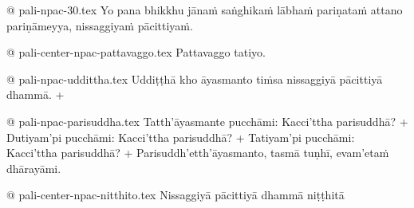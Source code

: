@ pali-npac-30.tex
Yo pana bhikkhu jānaṁ saṅghikaṁ lābhaṁ pariṇataṁ attano pariṇāmeyya, nissaggiyaṁ pācittiyaṁ.

@ pali-center-npac-pattavaggo.tex
Pattavaggo tatiyo.

@ pali-npac-uddittha.tex
Uddiṭṭhā kho āyasmanto tiṁsa nissaggiyā pācittiyā dhammā. +

@ pali-npac-parisuddha.tex
Tatth’āyasmante pucchāmi: Kacci’ttha parisuddhā? +
Dutiyam’pi pucchāmi: Kacci’ttha parisuddhā? +
Tatiyam’pi pucchāmi: Kacci’ttha parisuddhā? +
Parisuddh’etth’āyasmanto, tasmā tuṇhī, evam’etaṁ dhārayāmi.

@ pali-center-npac-nitthito.tex
Nissaggiyā pācittiyā dhammā niṭṭhitā
